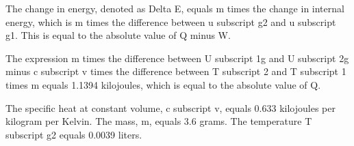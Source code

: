 The change in energy, denoted as Delta E, equals m times the change in internal energy, which is m times the difference between u subscript g2 and u subscript g1. This is equal to the absolute value of Q minus W.

The expression m times the difference between U subscript 1g and U subscript 2g minus c subscript v times the difference between T subscript 2 and T subscript 1 times m equals 1.1394 kilojoules, which is equal to the absolute value of Q.

The specific heat at constant volume, c subscript v, equals 0.633 kilojoules per kilogram per Kelvin. The mass, m, equals 3.6 grams. The temperature T subscript g2 equals 0.0039 liters.